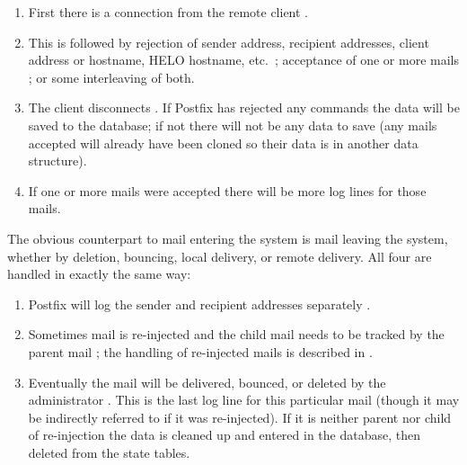 \begin{enumerate}

    \item First there is a connection from the remote client
        .

    \item This is followed by rejection of sender address, recipient
        addresses, client  address or hostname, HELO hostname,
        etc.\ ; acceptance of one or more
        mails ; or some interleaving of both.

    \item The client disconnects .  If Postfix has
        rejected any  commands the data will be saved to the
        database; if not there will not be any data to save (any mails
        accepted will already have been cloned so their data is in another
        data structure).

    \item If one or more mails were accepted there will be more log lines
        for those mails.

\end{enumerate}

The obvious counterpart to mail entering the system is mail leaving the
system, whether by deletion, bouncing, local delivery, or remote delivery.
All four are handled in exactly the same way:

\begin{enumerate}

    \item Postfix will log the sender and recipient addresses separately
        .

    \item Sometimes mail is re-injected and the child mail needs to be
        tracked by the parent mail ; the handling of
        re-injected mails is described in .

    \item Eventually the mail will be delivered, bounced, or deleted by the
        administrator .  This is the last log line
        for this particular mail (though it may be indirectly referred to
        if it was re-injected).  If it is neither parent nor child of
        re-injection the data is cleaned up and entered in the database,
        then deleted from the state tables.

\end{enumerate}


